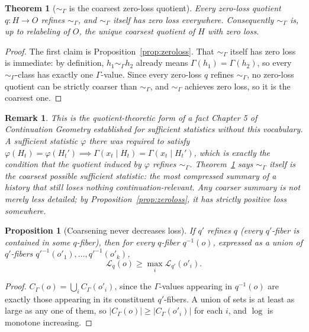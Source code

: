 \documentclass[11pt]{report}
\newtheorem{proposition}{Proposition}[chapter]
\newtheorem{theorem}{Theorem}[chapter]
\newtheorem{remark}{Remark}[chapter]
\begin{document}
\begin{theorem}[$\sim_\Gamma$ is the coarsest zero-loss quotient]
\label{thm:coarsest}
Every zero-loss quotient $q : H \to O$ refines $\sim_\Gamma$, and
$\sim_\Gamma$ itself has zero loss everywhere. Consequently
$\sim_\Gamma$ is, up to relabeling of $O$, the unique coarsest
quotient of $H$ with zero loss.
\end{theorem}
\begin{proof}
The first claim is Proposition~\ref{prop:zeroloss}. That
$\sim_\Gamma$ itself has zero loss is immediate: by definition,
$h_1 \sim_\Gamma h_2$ already means $\Gamma(h_1) = \Gamma(h_2)$, so
every $\sim_\Gamma$-class has exactly one $\Gamma$-value. Since every
zero-loss $q$ refines $\sim_\Gamma$, no zero-loss quotient can be
strictly coarser than $\sim_\Gamma$, and $\sim_\Gamma$ achieves zero
loss, so it is the coarsest one.
\end{proof}

\begin{remark}
This is the quotient-theoretic form of a fact Chapter 5 of
\emph{Continuation Geometry} established for sufficient statistics
without this vocabulary. A sufficient statistic $\varphi$ there was
required to satisfy $\varphi(H_t) = \varphi(H_t') \implies
\Gamma(x_t \mid H_t) = \Gamma(x_t \mid H_t')$, which is exactly the
condition that the quotient induced by $\varphi$ refines
$\sim_\Gamma$. Theorem~\ref{thm:coarsest} says $\sim_\Gamma$ itself is
the coarsest possible sufficient statistic: the most compressed
summary of a history that still loses nothing continuation-relevant.
Any coarser summary is not merely less detailed; by
Proposition~\ref{prop:zeroloss}, it has strictly positive loss
somewhere.
\end{remark}

\begin{proposition}[Coarsening never decreases loss]
\label{prop:monotone-ch3}
If $q'$ refines $q$ (every $q'$-fiber is contained in some $q$-fiber),
then for every $q$-fiber $q^{-1}(o)$, expressed as a union of
$q'$-fibers $q'^{-1}(o'_1), \dots, q'^{-1}(o'_k)$,
\[
\mathcal{L}_q(o) \geq \max_i \mathcal{L}_{q'}(o'_i).
\]
\end{proposition}
\begin{proof}
$C_\Gamma(o) = \bigcup_i C_{\Gamma}(o'_i)$, since the $\Gamma$-values
appearing in $q^{-1}(o)$ are exactly those appearing in its
constituent $q'$-fibers. A union of sets is at least as large as any
one of them, so $|C_\Gamma(o)| \geq |C_\Gamma(o'_i)|$ for each $i$,
and $\log$ is monotone increasing.
\end{proof}
\end{document}
